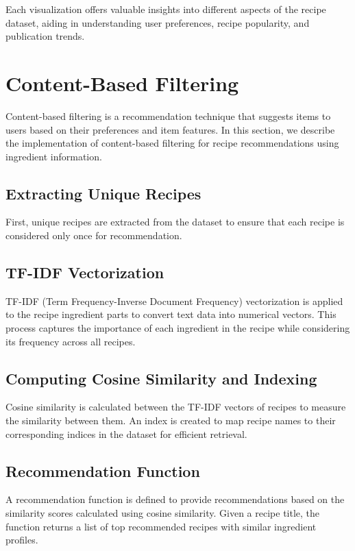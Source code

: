 \documentclass[conference]{IEEEtran}
\begin{document}
Each visualization offers valuable insights into different aspects of the recipe dataset, aiding in understanding user preferences, recipe popularity, and publication trends.

\section{Content-Based Filtering}

Content-based filtering is a recommendation technique that suggests items to users based on their preferences and item features. In this section, we describe the implementation of content-based filtering for recipe recommendations using ingredient information.

\subsection{Extracting Unique Recipes}

First, unique recipes are extracted from the dataset to ensure that each recipe is considered only once for recommendation.

\subsection{TF-IDF Vectorization}

TF-IDF (Term Frequency-Inverse Document Frequency) vectorization is applied to the recipe ingredient parts to convert text data into numerical vectors. This process captures the importance of each ingredient in the recipe while considering its frequency across all recipes.

\subsection{Computing Cosine Similarity and Indexing}

Cosine similarity is calculated between the TF-IDF vectors of recipes to measure the similarity between them. An index is created to map recipe names to their corresponding indices in the dataset for efficient retrieval.

\subsection{Recommendation Function}

A recommendation function is defined to provide recommendations based on the similarity scores calculated using cosine similarity. Given a recipe title, the function returns a list of top recommended recipes with similar ingredient profiles.
\end{document}
